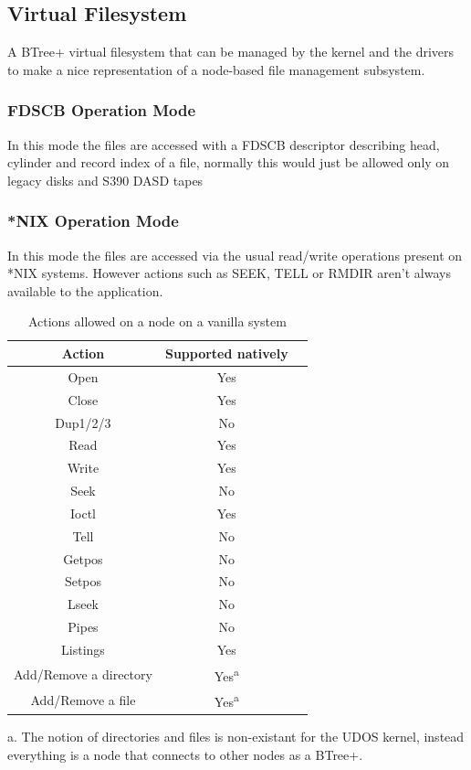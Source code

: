 \documentclass{article}
\begin{document}
\subsection{Virtual Filesystem}
A BTree+ virtual filesystem that can be managed by the kernel and the drivers to make a nice representation of a node-based file management subsystem.

\subsubsection{FDSCB Operation Mode}
In this mode the files are accessed with a FDSCB descriptor describing head,
cylinder and record index of a file, normally this would just be allowed only
on legacy disks and S390 DASD tapes

\subsubsection{*NIX Operation Mode}
In this mode the files are accessed via the usual read/write operations
present on *NIX systems. However actions such as SEEK, TELL or RMDIR aren't always available to the application.

\begin{table}
\begin{tabular}{ |c|c|c| }
	\hline
	Action & Supported natively \\
	\hline
	Open & Yes \\
	Close & Yes \\
	Dup1/2/3 & No \\
	Read & Yes \\
	Write & Yes \\
	Seek & No \\
	Ioctl & Yes \\
	Tell & No \\
	Getpos & No \\
	Setpos & No \\
	Lseek & No \\
	Pipes & No \\
	Listings & Yes \\
	Add/Remove a directory & Yes\textsuperscript{a} \\
	Add/Remove a file & Yes\textsuperscript{a} \\
	\hline
\end{tabular}
\caption{Actions allowed on a node on a vanilla system}
\begin{tablenotes}
\small
\item a. The notion of directories and files is non-existant for the UDOS kernel, instead everything is a node that connects to other nodes as a  BTree+.
\end{tablenotes}
\end{table}
\end{document}

